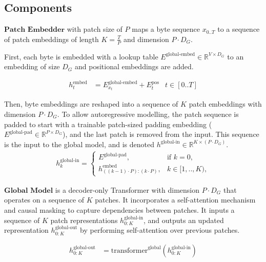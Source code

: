 \documentclass{article}
\newcommand{\h}[1]{h^\text{#1}}
\newcommand{\inR}[1]{\in\mathbb{R}^{#1}}
\newcommand{\transformer}[2]{\text{transformer}^{\text{#1}}(#2)}
\theoremstyle{plain}
\theoremstyle{definition}
\theoremstyle{remark}
\begin{document}
\subsection{Components}
$\textbf{Patch Embedder}$ with patch size of $P$ maps a byte sequence $x_{0..T}$ to a sequence of patch embeddings  
of length $K=\frac{T}{P}$ and dimension $P\cdot D_G$. 

First, each byte is embedded with a lookup table $E^{\text{global-embed}}\inR{V \times D_G}$ to an embedding of size $D_G$ and positional embeddings are added. 

\begin{align}
\h{embed}_{t}&= E^\text{global-embed}_{x_t}+E^\text{pos}_t & t\in [0..T]
\end{align}

Then, byte embeddings are reshaped into a sequence of $K$ patch embeddings with dimension $P\cdot D_G$.
To allow autoregressive modelling, the patch sequence is padded to start with a trainable patch-sized padding embedding ($E^{\text{global-pad}} \inR{P\times D_G} $), and the last patch is removed from the input. This sequence is the input to the global model, and is denoted $\h{global-in}\inR{K\times (P\cdot D_G)}$. 
\begin{align}
\h{global-in}_{k} = 
\begin{cases}
E^{\text{global-pad}} , & \text{if } k = 0, \\
\h{embed}_{((k-1)\cdot P):(k \cdot P)}, & k\in [1,..,K),
\end{cases}
\end{align}

$\textbf{Global Model}$ is a decoder-only Transformer 
with dimension $P\cdot D_G$ that operates on a sequence of $K$ patches. It incorporates a self-attention mechanism and causal masking to capture dependencies between patches. 
It inputs a sequence of $K$ patch representations $\h{global-in}_{0:K}$, and outputs an updated representation $\h{global-out}_{0:K}$ by performing self-attention over previous patches.

\begin{align}
\h{global-out}_{0:K} &= \transformer{global}{\h{global-in}_{0:K}} 
\end{align}
\end{document}
